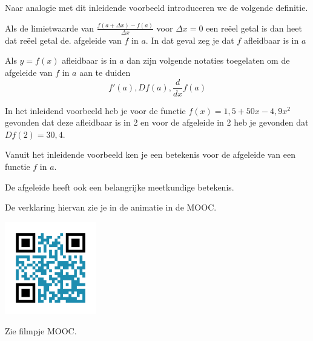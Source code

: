 Naar analogie met dit inleidende voorbeeld introduceren we de volgende definitie.

\begin{definitie}
	Als de limietwaarde van $\frac{f(a+\Delta x)-f(a)}{\Delta x}$ voor $\Delta x = 0$ een re\"eel getal is dan heet dat re\"eel getal de. afgeleide van $f$ in $a$.
	In dat geval zeg je dat $f$ afleidbaar is in $a$
\end{definitie}


\begin{notatie}
	Als $y=f(x)$ afleidbaar is in $a$ dan zijn volgende notaties toegelaten om de afgeleide van $f$ in $a$ aan te duiden
	\[f'(a), Df(a), \frac{d}{dx}f(a)\]
\end{notatie}


\begin{voorbeeld}
	In het inleidend voorbeeld heb je voor de functie  $f(x)=1,5+50 x -4,9 x^2$ gevonden dat deze afleidbaar is in 2 en voor de afgeleide in 2 heb je gevonden dat $Df(2)=30,4$.
\end{voorbeeld}\vspace{0,5 cm}

Vanuit het inleidende voorbeeld ken je een betekenis voor de afgeleide van een functie $f$ in $a$.\vspace{0,2 cm}

\vspace{0,5 cm}

De afgeleide heeft ook een belangrijke meetkundige betekenis.\vspace{0,2 cm}

\vspace{0,2 cm}

De verklaring hiervan zie je in de animatie in de MOOC.

\begin{minipage}{.25\linewidth}
	\raggedright
	\includegraphics[width=4cm]{6_afgeleiden_integralen/inputs/QR_Code_AFGANIMATIE_module6_1}
\end{minipage}
\begin{minipage}{.7\linewidth}
	Zie filmpje MOOC.
\end{minipage}


